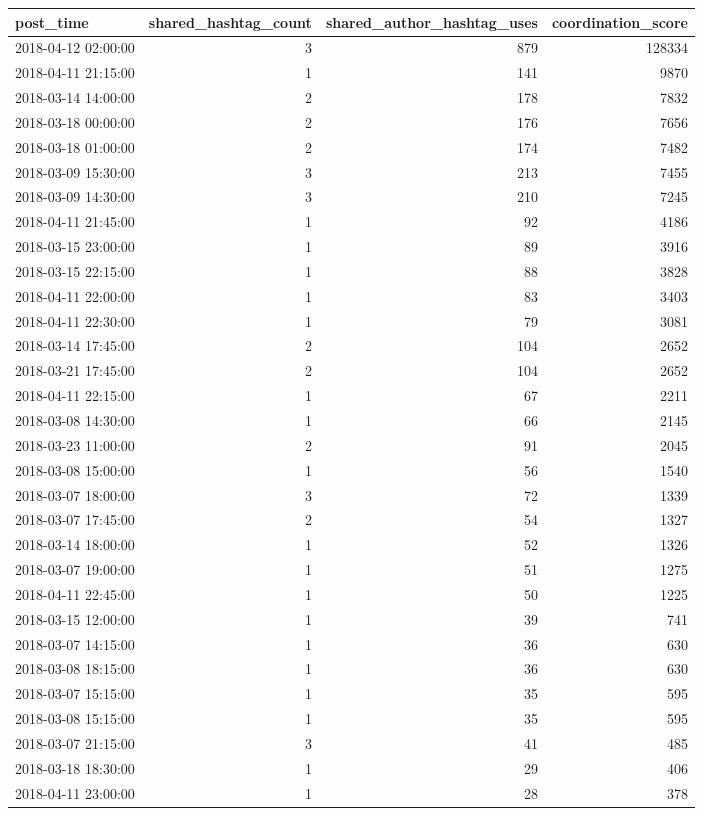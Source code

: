 \begin{tabular}{lrrr}
\toprule
post\_time & shared\_hashtag\_count & shared\_author\_hashtag\_uses & coordination\_score \\
\midrule
2018-04-12 02:00:00 & 3 & 879 & 128334 \\
2018-04-11 21:15:00 & 1 & 141 & 9870 \\
2018-03-14 14:00:00 & 2 & 178 & 7832 \\
2018-03-18 00:00:00 & 2 & 176 & 7656 \\
2018-03-18 01:00:00 & 2 & 174 & 7482 \\
2018-03-09 15:30:00 & 3 & 213 & 7455 \\
2018-03-09 14:30:00 & 3 & 210 & 7245 \\
2018-04-11 21:45:00 & 1 & 92 & 4186 \\
2018-03-15 23:00:00 & 1 & 89 & 3916 \\
2018-03-15 22:15:00 & 1 & 88 & 3828 \\
2018-04-11 22:00:00 & 1 & 83 & 3403 \\
2018-04-11 22:30:00 & 1 & 79 & 3081 \\
2018-03-14 17:45:00 & 2 & 104 & 2652 \\
2018-03-21 17:45:00 & 2 & 104 & 2652 \\
2018-04-11 22:15:00 & 1 & 67 & 2211 \\
2018-03-08 14:30:00 & 1 & 66 & 2145 \\
2018-03-23 11:00:00 & 2 & 91 & 2045 \\
2018-03-08 15:00:00 & 1 & 56 & 1540 \\
2018-03-07 18:00:00 & 3 & 72 & 1339 \\
2018-03-07 17:45:00 & 2 & 54 & 1327 \\
2018-03-14 18:00:00 & 1 & 52 & 1326 \\
2018-03-07 19:00:00 & 1 & 51 & 1275 \\
2018-04-11 22:45:00 & 1 & 50 & 1225 \\
2018-03-15 12:00:00 & 1 & 39 & 741 \\
2018-03-07 14:15:00 & 1 & 36 & 630 \\
2018-03-08 18:15:00 & 1 & 36 & 630 \\
2018-03-07 15:15:00 & 1 & 35 & 595 \\
2018-03-08 15:15:00 & 1 & 35 & 595 \\
2018-03-07 21:15:00 & 3 & 41 & 485 \\
2018-03-18 18:30:00 & 1 & 29 & 406 \\
2018-04-11 23:00:00 & 1 & 28 & 378 \\

\end{tabular}
